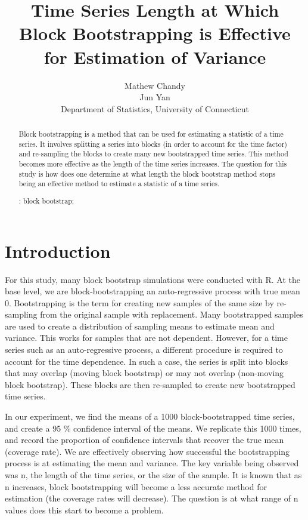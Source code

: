 \documentclass[12pt, letterpaper, titlepage]{article}
\title{Time Series Length at Which Block Bootstrapping is Effective for Estimation of Variance}
\author{Mathew Chandy\\
  Jun Yan\\[1ex]
  Department of Statistics, University of Connecticut\\
}
\date{}
\begin{document}
\maketitle

\doublespace

\begin{abstract}
Block bootstrapping is a method that can be used for estimating a statistic of a time
series. It involves splitting a series into blocks (in order to account for the time
factor) and re-sampling the blocks to create many new bootstrapped time series.
This method becomes more effective as the length of the time series increases. 
The question for this study is how does one determine at what length the block
bootstrap method stops being an effective method to estimate a statistic of a time
series.

\bigskip
\noindent{}:
block bootstrap;
\end{abstract}

\section{Introduction}
\label{sec:intro}

For this study, many block bootstrap simulations were conducted with R. At the base
level, we are block-bootstrapping an auto-regressive process with true mean 0.
Bootstrapping is the term for creating new samples of the same size by re-sampling from
the original sample with replacement. Many bootstrapped samples are used to create a
distribution of sampling means to estimate mean and variance. This works for samples
that are not dependent. However, for a time series such as an auto-regressive process,
a different procedure is required to account for the time dependence. In such a case,
the series is split into blocks that may overlap (moving block bootstrap) or may not
overlap (non-moving block bootstrap). These blocks are then re-sampled to create new
bootstrapped time series. 

In our experiment, we find the means of a 1000 block-bootstrapped time series, 
and create a 95 \% confidence interval of the means. We replicate this 1000 times, 
and record the proportion of confidence intervals that recover the true mean 
(coverage rate). We are effectively observing how successful the bootstrapping process
is at estimating the mean and variance. The key variable being observed was n, 
the length of the time series, or the size of the sample. It is known that as n
increases, block bootstrapping will become a less accurate method for estimation
(the coverage rates will decrease). The question is at what range of n values does this
start to become a problem. 
\end{document}

